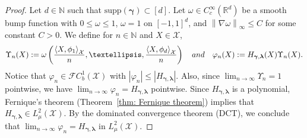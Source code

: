 \documentclass[namedate,webpdf]{ima-authoring-template-blank}
\newcommand*{\supp}{\mathrm{supp}}
\newcommand*{\nm}[1]{{\left\|#1\right \|}}
\newcommand{\abs}[1]{\left|#1\right|}
\newcommand{\absd}[1]{|#1|}    %
\newcommand*{\ip}[2]{\left\langle #1, #2 \right\rangle}
\numberwithin{counter}{section}
\numberwithin{equation}{section}
\theoremstyle{plain}
\theoremstyle{definition}
\newcommand*{\cF}{\mathcal{F}}
\newcommand*{\cX}{\mathcal{X}}
\newcommand*{\bbN}{\mathbb{N}}
\newcommand*{\bbR}{\mathbb{R}}
\theoremstyle{thmstyletwo}
\begin{document}
\begin{proof}
    Let \( d \in \bbN \) such that \( \supp(\bm{\gamma}) \subset [d] \). Let \( \omega \in C_c^{\infty}(\bbR^d) \) be a smooth bump function with \( 0 \leq \omega \leq 1 \), \( \omega = 1 \) on \( [-1,1]^d \), and \( \nm{\nabla \omega}_{\infty} \leq C \) for some constant \( C > 0 \). We define for \( n \in \bbN \) and \( X \in \cX \),
    \[
    \Upsilon_n(X) := \omega \left( \frac{\ip{X}{\phi_1}_{\cX}}{n}, \dots, \frac{\ip{X}{\phi_d}_{\cX}}{n} \right) \quad \textup{and} \quad \varphi_n(X) := H_{\bm{\gamma}, \bm{\lambda}}(X) \Upsilon_n(X).
    \]
    Notice that \( \varphi_n \in \cF C_b^1(\cX) \) with \( \abs{\varphi_n} \leq \absd{H_{\bm{\gamma}, \bm{\lambda}}} \). Also, since \( \lim_{n \to \infty} \Upsilon_n = 1 \) pointwise, we have \( \lim_{n \to \infty} \varphi_n = H_{\bm{\gamma}, \bm{\lambda}} \) pointwise. Since \( H_{\bm{\gamma}, \bm{\lambda}} \) is a polynomial, Fernique's theorem (Theorem~\ref{thm: Fernique theorem}) implies that \( H_{\bm{\gamma}, \bm{\lambda}} \in L^2_{\mu}(\cX) \). By the dominated convergence theorem (DCT), we conclude that \( \lim_{n \to \infty} \varphi_n = H_{\bm{\gamma}, \bm{\lambda}} \) in \( L^2_{\mu}(\cX) \).
    

\end{proof}
\end{document}
